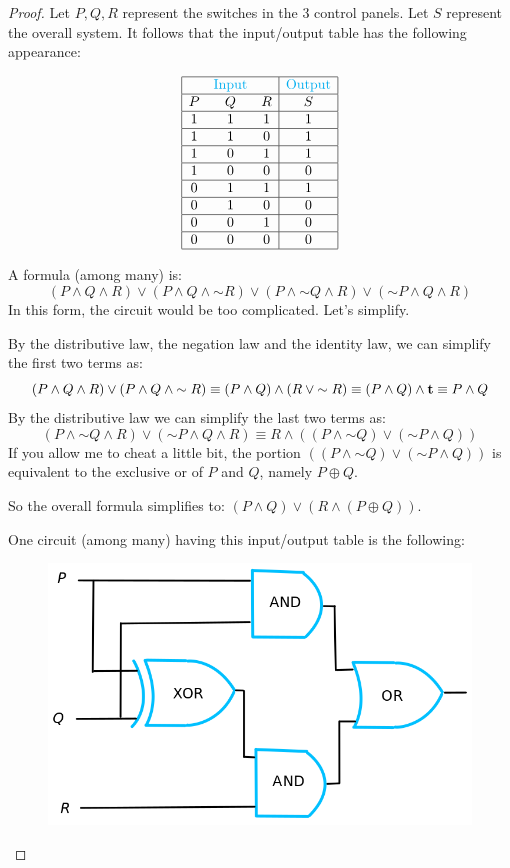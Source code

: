 \documentclass[14pt]{extarticle}
\newcommand{\true}{{\bf t}}
\begin{document}
\begin{proof}
Let $P, Q, R$ represent the switches in the 3 control panels. Let $S$ represent the overall system. It follows that the input/output table has the following appearance:

$$
\begin{array}{|ccc|c|}
\hline
& \color{cyan}\text{Input} & & \color{cyan}\text{Output} \\
\hline
P&Q&R&S\\
\hline
1&1&1&1\\
\hline
1&1&0&1\\
\hline
1&0&1&1\\
\hline
1&0&0&0\\
\hline
0&1&1&1\\
\hline
0&1&0&0\\
\hline
0&0&1&0\\
\hline
0&0&0&0\\
\hline
\end{array}
$$

A formula (among many) is:
$$
(P \wedge Q \wedge R) \vee (P \wedge Q \wedge {\sim R}) \vee (P \wedge {\sim Q} \wedge R) \vee ({\sim P} \wedge Q \wedge R)
$$
In this form, the circuit would be too complicated. Let's simplify.

By the distributive law, the negation law and the identity law, we can simplify the first two terms as:
$$
(P \wedge Q \wedge R) \vee (P \wedge Q \wedge {\sim R}) \equiv (P \wedge Q) \wedge (R \vee {\sim R}) \equiv (P \wedge Q) \wedge \true \equiv P \wedge Q
$$
By the distributive law we can simplify the last two terms as:
$$
(P \wedge {\sim Q} \wedge R) \vee ({\sim P} \wedge Q \wedge R) \equiv R \wedge ((P \wedge {\sim Q}) \vee ({\sim P} \wedge Q))
$$
If you allow me to cheat a little bit, the portion $((P \wedge {\sim Q}) \vee ({\sim P} \wedge Q))$ is equivalent to the exclusive or of $P$ and $Q$, namely $P \oplus Q$.

So the overall formula simplifies to: $(P \wedge Q) \vee (R \wedge (P \oplus Q))$.

One circuit (among many) having this input/output table is the following:

\begin{figure}[ht!]
\centering
\includegraphics[scale=0.3]{../images/2.4.25.png}
\end{figure}
\end{proof}
\end{document}
